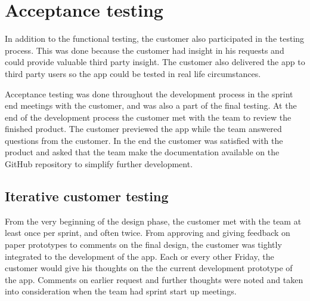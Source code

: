 \section{Acceptance testing}
In addition to the functional testing, the customer also participated in the testing process. This was done because the customer had insight in his requests and could provide valuable third party insight. The customer also delivered the app to third party users so the app could be tested in real life circumstances.

Acceptance testing was done throughout the development process in the sprint end meetings with the customer, and was also a part of the final testing. At the end of the development process the customer met with the team to review the finished product. The customer previewed the app while the team answered questions from the customer. In the end the customer was satisfied with the product and asked that the team make the documentation available on the GitHub repository to simplify further development.

\subsection{Iterative customer testing}
From the very beginning of the design phase, the customer met with the team at least once per sprint, and often twice. From approving and giving feedback on paper prototypes to comments on the final design, the customer was tightly integrated to the development of the app. Each or every other Friday, the customer would give his thoughts on the the current development prototype of the app. Comments on earlier request and further thoughts were noted and taken into consideration when the team had sprint start up meetings. 